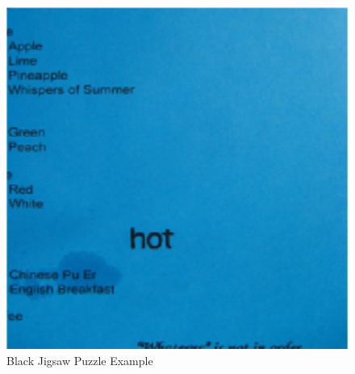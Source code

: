 \documentclass{article}
\begin{document}
\begin{figure}
\begin{minipage}{\textwidth}
\begin{minipage}{.49\textwidth}
\begin{minipage}{.49\textwidth}
            \end{minipage}
            \caption{Black Jigsaw Puzzle Example}
            \label{fig:blackjigsawpuzzle}
        \end{minipage}
    \end{minipage}
    \begin{minipage}{\textwidth}
        \begin{minipage}{.49\textwidth}
            \begin{minipage}{.49\textwidth}
                \centering
                \includegraphics[width=\textwidth]{origin_blue}
            \end{minipage}
            \begin{minipage}{.49\textwidth}
                \centering

\end{minipage}
\end{minipage}
\end{minipage}
\end{figure}
\end{document}
